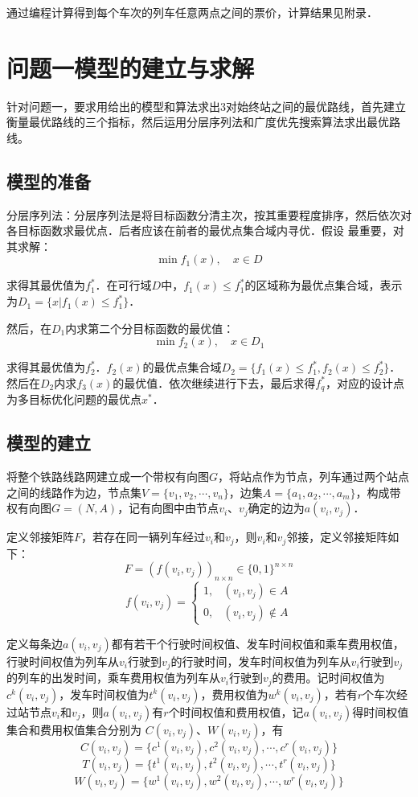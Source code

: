\documentclass[nocover]{cumcmart}%
\begin{document}
通过编程计算得到每个车次的列车任意两点之间的票价，计算结果见附录．

\section{问题一模型的建立与求解}
针对问题一，要求用给出的模型和算法求出3对始终站之间的最优路线，首先建立衡量最优路线的三个指标，然后运用分层序列法和广度优先搜索算法求出最优路线。

\subsection{模型的准备}
分层序列法：分层序列法是将目标函数分清主次，按其重要程度排序，然后依次对各目标函数求最优点．后者应该在前者的最优点集合域内寻优．假设 最重要，对其求解：
$$\min f_1(x), \quad x \in D$$

求得其最优值为$f_1^*$．在可行域$D$中，$f_1(x) \leq f_1^*$的区域称为最优点集合域，表示为$D_1 = \{x|f_1(x) \leq f_1^*\}$．

然后，在$D_1$内求第二个分目标函数的最优值：
$$\min f_2(x), \quad x \in D_1$$

求得其最优值为$f_2^*$．$f_2(x)$的最优点集合域$D_2 = \{f_1(x)\leq f_1^*, f_2(x)\leq f_2^*\}$． 然后在$D_2$内求$f_3(x)$的最优值．依次继续进行下去，最后求得$f_q^*$，对应的设计点为多目标优化问题的最优点$x^*$．

\subsection{模型的建立}
将整个铁路线路网建立成一个带权有向图$G$，将站点作为节点，列车通过两个站点之间的线路作为边，节点集$V = \{v_1,v_2,\cdots,v_n\}$，边集$A = \{a_1,a_2,\cdots,a_m\}$，构成带权有向图$G = (N,A)$，记有向图中由节点$v_i$、$v_j$确定的边为$a(v_i,v_j)$．

定义邻接矩阵$F$，若存在同一辆列车经过$v_i$和$v_j$，则$v_i$和$v_j$邻接，定义邻接矩阵如下：
$$F = (f(v_i,v_j))_{n\times n} \in \{0,1\}^{n \times n}$$
\[f(v_i,v_j) = \begin{cases}
1, & (v_i,v_j) \in A \\
0, & (v_i,v_j) \notin A
\end{cases}\]

定义每条边$a(v_i,v_j)$都有若干个行驶时间权值、发车时间权值和乘车费用权值，行驶时间权值为列车从$v_i$行驶到$v_j$的行驶时间，发车时间权值为列车从$v_i$行驶到$v_j$的列车的出发时间，乘车费用权值为列车从$v_i$行驶到$v_j$的费用。记时间权值为$c^k(v_i,v_j)$，发车时间权值为$t^k(v_i,v_j)$，费用权值为$w^k(v_i,v_j)$，若有$r$个车次经过站节点$v_i$和$v_j$，则$a(v_i,v_j)$有$r$个时间权值和费用权值，记$a(v_i,v_j)$得时间权值集合和费用权值集合分别为 $C(v_i,v_j)$、$W(v_i,v_j)$，有
\[C(v_i,v_j) = \{c^1(v_i,v_j),c^2(v_i,v_j),\cdots,c^r(v_i,v_j)\}\]
\[T(v_i,v_j) = \{t^1(v_i,v_j),t^2(v_i,v_j),\cdots,t^r(v_i,v_j)\}\]
\[W(v_i,v_j) = \{w^1(v_i,v_j),w^2(v_i,v_j), \cdots, w^r(v_i,v_j)\}\]
\end{document}
